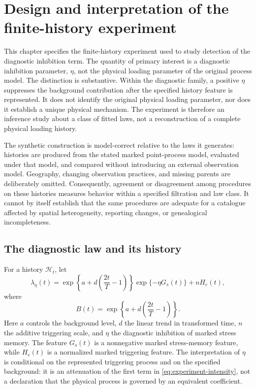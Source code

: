 \chapter{Design and interpretation of the finite-history experiment}
\label{ch:design}

This chapter specifies the finite-history experiment used to study detection of the diagnostic inhibition term. The quantity of primary interest is a diagnostic inhibition parameter, \(\eta\), not the physical loading parameter of the original process model. The distinction is substantive. Within the diagnostic family, a positive \(\eta\) suppresses the background contribution after the specified history feature is represented. It does not identify the original physical loading parameter, nor does it establish a unique physical mechanism. The experiment is therefore an inference study about a class of fitted laws, not a reconstruction of a complete physical loading history.

The synthetic construction is model-correct relative to the laws it generates: histories are produced from the stated marked point-process model, evaluated under that model, and compared without introducing an external observation model. Geography, changing observation practices, and missing parents are deliberately omitted. Consequently, agreement or disagreement among procedures on these histories measures behavior within a specified filtration and law class. It cannot by itself establish that the same procedures are adequate for a catalogue affected by spatial heterogeneity, reporting changes, or genealogical incompleteness.

\section{The diagnostic law and its history}

For a history \(\mathcal H_t\), let
\begin{equation}
\lambda_\eta(t)
=
\exp\!\left\{a+d\left(\frac{2t}{T}-1\right)\right\}
\exp\{-\eta G_s(t)\}
+
nH_e(t),
\label{eq:experiment-intensity}
\end{equation}
where
\[
B(t)
=
\exp\!\left\{a+d\left(\frac{2t}{T}-1\right)\right\}.
\]
Here \(a\) controls the background level, \(d\) the linear trend in transformed time, \(n\) the additive triggering scale, and \(\eta\) the diagnostic inhibition of marked stress memory. The feature \(G_s(t)\) is a nonnegative marked stress-memory feature, while \(H_e(t)\) is a normalized marked triggering feature. The interpretation of \(\eta\) is conditional on the represented triggering process and on the specified background: it is an attenuation of the first term in \eqref{eq:experiment-intensity}, not a declaration that the physical process is governed by an equivalent coefficient.

